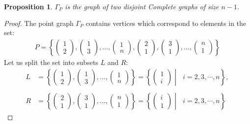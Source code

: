 \documentclass{article}
\newtheorem{proposition}{Proposition}
\begin{document}
\begin{proposition}
    \(\Gamma_P\) is the graph of two disjoint Complete graphs of size \(n-1\).%
    \end{proposition}
\begin{proof}
    The point graph \(\Gamma_P\) contains vertices which correspond to elements in the set: \\
    \begin{align*}
        P = \left\{ \begin{pmatrix} 1 \\ 2 \end{pmatrix}, \begin{pmatrix} 1 \\ 3 \end{pmatrix},..., \begin{pmatrix} 1 \\ n \end{pmatrix}, \begin{pmatrix} 2 \\ 1 \end{pmatrix}, \begin{pmatrix} 3 \\ 1 \end{pmatrix},..., \begin{pmatrix} n \\ 1 \end{pmatrix} \right\}
    \end{align*}
    Let us split the set into subsets \(L\) and \(R\):
    \begin{align*}
        L &= \left\{ \begin{pmatrix} 1 \\ 2 \end{pmatrix}, \begin{pmatrix} 1 \\ 3 \end{pmatrix},..., \begin{pmatrix} 1 \\ n \end{pmatrix}\right\} = \left \{ \begin{pmatrix} 1 \\ i \end{pmatrix} \middle| \text{ }i = 2, 3, \cdots, n\right \}, \\ \\
        R &= \left\{ \begin{pmatrix} 2 \\ 1 \end{pmatrix}, \begin{pmatrix} 3 \\ 1 \end{pmatrix},..., \begin{pmatrix} n \\ 1 \end{pmatrix} \right\} = \left \{ \begin{pmatrix} i \\ 1 \end{pmatrix} \middle| \text{ }i = 2, 3, \cdots, n\right \}

\end{align*}
\end{proof}
\end{document}
